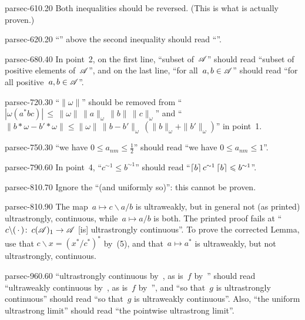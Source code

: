 \documentclass[b5page]{book}
\begin{document}
\begin{erratum}{parsec-610.20}
Both inequalities should be reversed.
(This is what is actually proven.)
\end{erratum}
\begin{erratum}{parsec-620.20}
``'' above the second inequality
should read ``''.
\end{erratum}
\begin{erratum}{parsec-680.40}
In point~2, on the first line,
``subset of~$\mathscr{A}$'' should read
``subset of positive elements of~$\mathscr{A}$'',
and on the last line,
``for all~$a,b\in\mathscr{A}$'' should read
``for all positive~$a,b\in\mathscr{A}$''.
\end{erratum}
\begin{erratum}{parsec-720.30}
``$\|\omega\|$''
should be removed
from
``$\left|\omega(a^*bc)\right|\,\leq\,
\|\omega\|\,\|a\|_\omega\,\|b\|\,\|c\|_\omega$''
and 
``$\|b\ast \omega-b'\ast \omega\|
\leq \|\omega\|\,\|b-b'\|_\omega\,(\|b\|_\omega+\|b'\|_\omega)$''
in point~1.
\end{erratum}
\begin{erratum}{parsec-750.30}
``we have $0\leq a_{nm}\leq \frac{1}{2}$''
should read ``we have $0\leq a_{nm}\leq 1$''.
\end{erratum}
\begin{erratum}{parsec-790.60}
In point~4,
``$c^{\sim1}\leq b^{\sim1}$''
should read
``$\left\lceil b\right\rceil c^{\sim1}\left\lceil b\right\rceil\leqslant b^{\sim1}$''.
\end{erratum}
\begin{erratum}{parsec-810.70}
Ignore the ``(and uniformly so)'': this cannot be proven.
\end{erratum}
\begin{erratum}{parsec-810.90}
The map~$a\mapsto c\backslash a/b$
is ultraweakly,
but in general not (as printed) ultrastrongly, continuous,
while~$a\mapsto a/b$ is both.
The printed proof fails at
``$c\backslash(\,\cdot\,)\colon\, c(\mathscr{A})_1\to\mathscr{A}$
[is] ultrastrongly continuous''.
To prove the corrected Lemma, use that
$c\backslash x = (x^*/c^*)^*$
by~(5),
and that~$a\mapsto a^*$ is ultraweakly,
but not ultrastrongly, continuous.
\end{erratum}
\begin{erratum}{parsec-960.60}
``ultrastrongly continuous by~,
as is~$f$ by~''
should read
``ultraweakly continuous by~,
as is~$f$ by~'',
and ``so that~$g$ is ultrastrongly continuous''
should read ``so that~$g$ is ultraweakly continuous''.
Also, ``the uniform ultrastrong limit''
should read ``the pointwise ultrastrong limit''.
\end{erratum}
\end{document}
